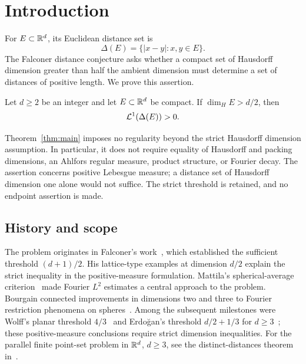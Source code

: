 \section{Introduction}\label{sec:introduction}

For \(E\subset\mathbb R^d\), its Euclidean distance set is
\[
 \Delta(E)=\{|x-y|:x,y\in E\}.
\]
The Falconer distance conjecture asks whether a compact set of Hausdorff
dimension greater than half the ambient dimension must determine a set
of distances of positive length. We prove this assertion.

\begin{theorem}\label{thm:main}
Let \(d\ge2\) be an integer and let \(E\subset\mathbb R^d\) be compact. If
\(\dim_H E>d/2\), then
\[
 \mathcal L^1(\Delta(E))>0.
\]
\end{theorem}

Theorem~\ref{thm:main} imposes no regularity beyond the strict Hausdorff
dimension assumption. In particular, it does not require equality of
Hausdorff and packing dimensions, an Ahlfors regular measure, product
structure, or Fourier decay. The assertion concerns positive Lebesgue
measure; a distance set of Hausdorff dimension one alone would not
suffice. The strict threshold is retained, and no endpoint assertion is made.

\subsection{History and scope}

The problem originates in Falconer's work~\cite{Falconer1985}, which
established the sufficient threshold \((d+1)/2\). His lattice-type examples
at dimension \(d/2\) explain the strict inequality in the positive-measure
formulation. Mattila's spherical-average criterion~\cite{Mattila1987}
made Fourier \(L^2\) estimates a central approach to the problem.
Bourgain connected improvements in dimensions two and three to Fourier
restriction phenomena on spheres~\cite{Bourgain1994}.
Among the subsequent milestones were Wolff's planar threshold
\(4/3\)~\cite{Wolff1999} and Erdo\u{g}an's threshold
\(d/2+1/3\) for \(d\ge3\)~\cite[Theorem~2]{Erdogan2005};
these positive-measure conclusions require strict dimension inequalities.
For the parallel finite point-set problem in \(\mathbb R^d\), \(d\ge3\), see the
distinct-distances theorem in~\cite[Theorem~1.1]{OpenAIDistinctDistances2026}.

